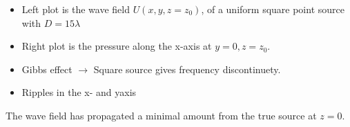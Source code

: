 \documentclass[compress]{beamer}
\begin{document}
\begin{frame}
\begin{columns}
\begin{column}{0.5\textwidth}
\begin{figure}
            \end{figure}
        \end{column}
    \end{columns}
    \begin{itemize}
        \item Left plot is the wave field $U(x,y,z=z_0)$, of a uniform square point source with $D=15\lambda$
        \item Right plot is the pressure along the x-axis at $y = 0, z=z_0$.
        \item Gibbs effect $\rightarrow$ Square source gives frequency discontinuety.
        \item Ripples in the x- and yaxis
    \end{itemize}
    The wave field has propagated a minimal amount from the true source at $z=0$.
\end{frame} %
\end{document}

